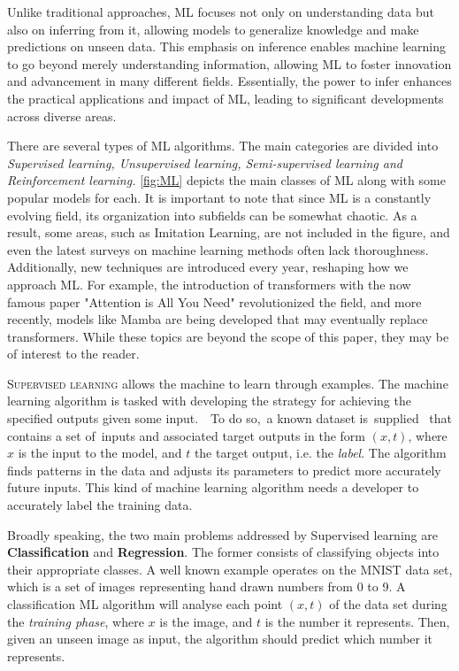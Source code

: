 \documentclass{article}
\begin{document}
Unlike traditional approaches, ML focuses not only on understanding data but also on inferring from it, allowing models to generalize knowledge and make predictions on unseen data. This emphasis on inference enables machine learning to go beyond merely understanding information, allowing ML to foster innovation and advancement in many different fields. Essentially, the power to infer enhances the practical applications and impact of ML, leading to significant developments across diverse areas.

There are several types of ML algorithms. The main categories are divided into \textit{Supervised learning, Unsupervised learning, Semi-supervised learning and Reinforcement learning.} \autoref{fig:ML} depicts the main classes of ML along with some popular models for each. It is important to note that since ML is a constantly evolving field, its organization into subfields can be somewhat chaotic. As a result, some areas, such as Imitation Learning, are not included in the figure, and even the latest surveys on machine learning methods often lack thoroughness. Additionally, new techniques are introduced every year, reshaping how we approach ML. For example, the introduction of transformers with the now famous paper "Attention is All You Need" \citep{vaswani2023attention} revolutionized the field, and more recently, models like Mamba \citep{gu2023mamba} are being developed that may eventually replace transformers. While these topics are beyond the scope of this paper, they may be of interest to the reader.

\vspace{4mm}
  \noindent \textsc{Supervised learning} allows the machine to learn through examples. The machine learning algorithm is tasked with developing the strategy for achieving the specified outputs given some input.  To do so, a known dataset is supplied  that contains a set of inputs and associated target outputs in the form $(x, t)$, where $x$ is the input to the model, and $t$ the target output, i.e. the \textit{label}. The algorithm finds patterns in the data and adjusts its parameters to predict more accurately future inputs. This kind of machine learning algorithm needs a developer to accurately label the training data. 

  Broadly speaking, the two main problems addressed by Supervised learning are \textbf{Classification} and \textbf{Regression}. The former consists of classifying objects into their appropriate classes. A well known example operates on the MNIST data set, which is a set of images representing hand drawn numbers from 0 to 9. A classification ML algorithm will analyse each point $(x,t)$ of the data set during the \textit{training phase}, where $x$ is the image, and $t$ is the number it represents. Then, given an unseen image as input, the algorithm should predict which number it represents.
\end{document}
